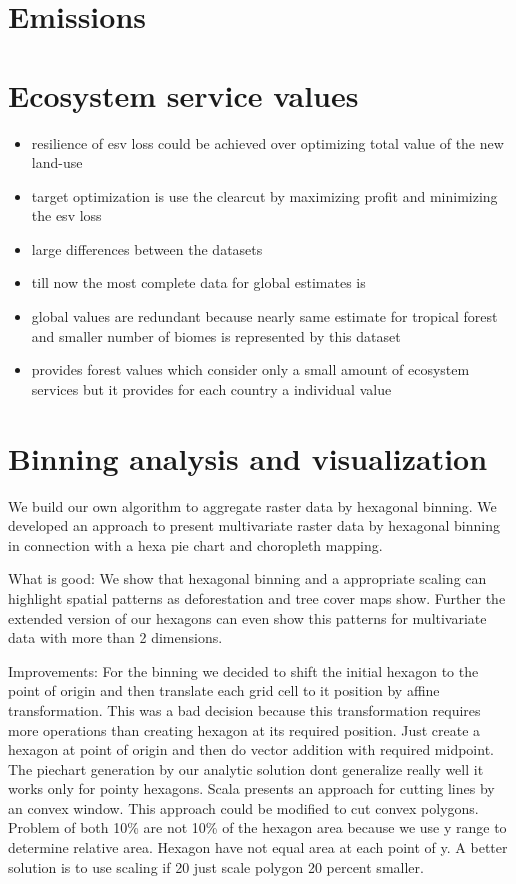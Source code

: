 	\section{Emissions}

	\section{Ecosystem service values}
		\begin{itemize}
			\item resilience of esv loss could be achieved over optimizing total value of the new land-use
			\item target optimization is use the clearcut by maximizing profit and minimizing the esv loss
			\item large differences between the datasets
			\item till now the most complete data for global estimates is \citeauthor{Costanza2014}
			\item \citeauthor{Groot2012} global values are redundant because nearly same estimate for tropical forest and smaller number of biomes is represented by this dataset
			\item \citeauthor{Siikamaki2015} provides forest values which consider only a small amount of ecosystem services but it provides for each country a individual value
		\end{itemize}

	\section{Binning analysis and visualization}
		We build our own algorithm to aggregate raster data by hexagonal binning. We developed an approach to present multivariate raster data by hexagonal binning in connection with a hexa pie chart and choropleth mapping.

		What is good:
		We show that hexagonal binning and a appropriate scaling can highlight spatial patterns as deforestation and tree cover maps show. Further the extended version of our hexagons can even show this patterns for multivariate data with more than 2 dimensions.

		Improvements:
		For the binning we decided to shift the initial hexagon to the point of origin and then translate each grid cell to it position by affine transformation. This was a bad decision because this transformation requires more operations than creating hexagon at its required position. Just create a hexagon at point of origin and then do vector addition with required midpoint. The piechart generation by our analytic solution dont generalize really well it works only for pointy hexagons. Scala presents an approach for cutting lines by an convex window. This approach could be modified to cut convex polygons. Problem of both 10\% are not 10\% of the hexagon area because we use y range to determine relative area. Hexagon have not equal area at each point of y. A better solution is to use scaling if 20 just scale polygon 20 percent smaller.

